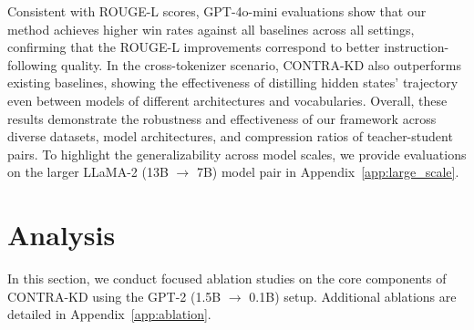 \documentclass{article} %
\theoremstyle{definition}
\theoremstyle{remark}
\begin{document}
Consistent with ROUGE-L scores, GPT-4o-mini evaluations show that our method achieves higher win rates against all baselines across all settings, confirming that the ROUGE-L improvements correspond to better instruction-following quality. In the cross-tokenizer scenario, CONTRA-KD also outperforms existing baselines, showing the effectiveness of distilling hidden states' trajectory even between models of different architectures and vocabularies. Overall, these results demonstrate the robustness and effectiveness of our framework across diverse datasets, model architectures, and compression ratios of teacher-student pairs. To highlight the generalizability across model scales, we provide evaluations on the larger LLaMA-2 (13B $\rightarrow$ 7B) model pair in Appendix~\ref{app:large_scale}. 

\section{Analysis}
In this section, we conduct focused ablation studies on the core components of \textsc{CONTRA-KD} using the GPT-2 (1.5B $\rightarrow$ 0.1B) setup. Additional ablations are detailed in Appendix~\ref{app:ablation}.
\end{document}
